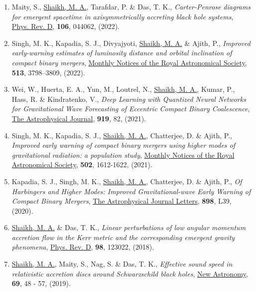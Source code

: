 \begin{enumerate}
\item Maity, S., \underline{Shaikh, M. A.}, Tarafdar, P. \& Das, T. K., {\itshape {Carter-Penrose diagrams for emergent spacetime in axisymmetrically accreting black hole systems}}, \href{https://doi.org/10.1103/PhysRevD.106.044062}{{Phys. Rev. D}}, {\bfseries 106}, 044062, (2022).
\item Singh, M. K., Kapadia, S. J., Divyajyoti, \underline{Shaikh, M. A.} \& Ajith, P., {\itshape {Improved early-warning estimates of luminosity distance and orbital inclination of compact binary mergers}}, \href{https://doi.org/10.1093/mnras/stac852}{{Monthly Notices of the Royal Astronomical Society}}, {\bfseries 513}, 3798–3809, (2022).
\item Wei, W., Huerta, E. A., Yun, M., Loutrel, N.,  \underline{Shaikh, M. A.}, Kumar, P., Hass, R. \& Kindratenko, V., {\itshape  Deep Learning with Quantized Neural Networks for Gravitational Wave Forecasting of Eccentric Compact Binary Coalescence}, \href{https://iopscience.iop.org/article/10.3847/1538-4357/ac1121}{The Astrophysical Journal}, {\bfseries 919}, 82, (2021).
\item Singh, M. K., Kapadia, S. J., \underline{Shaikh, M. A.}, Chatterjee, D. \& Ajith, P., {\itshape {Improved early warning of compact binary mergers using higher modes of gravitational radiation: a population study}}, \href{https://doi.org/10.1093/mnras/stab125}{{Monthly Notices of the Royal Astronomical Society}}, {\bfseries 502}, 1612-1622, (2021).
\item Kapadia, S. J., Singh, M. K., \underline{Shaikh, M. A.}, Chatterjee, D. \& Ajith, P., {\itshape Of Harbingers and Higher Modes: Improved Gravitational-wave Early Warning of Compact Binary Mergers}, \href{https://doi.org/10.3847%2F2041-8213%2Faba42d}{{The Astrophysical Journal Letters}}, {\bfseries 898}, L39, (2020).
\item \underline{Shaikh, M. A.} \& Das, T. K., {\itshape Linear perturbations of low angular momentum accretion flow in the Kerr metric and the corresponding emergent gravity phenomena}, \href{https://link.aps.org/doi/10.1103/PhysRevD.98.123022}{{Phys. Rev. D}}, {\bfseries 98}, 123022, (2018).
\item \underline{Shaikh, M. A.}, Maity, S., Nag, S. \& Das, T. K., {\itshape Effective sound speed in relativistic accretion discs around Schwarzschild black holes}, \href{http://www.sciencedirect.com/science/article/pii/S1384107618302896}{{New Astronomy}}, {\bfseries 69}, 48 - 57, (2019).

\end{enumerate}
